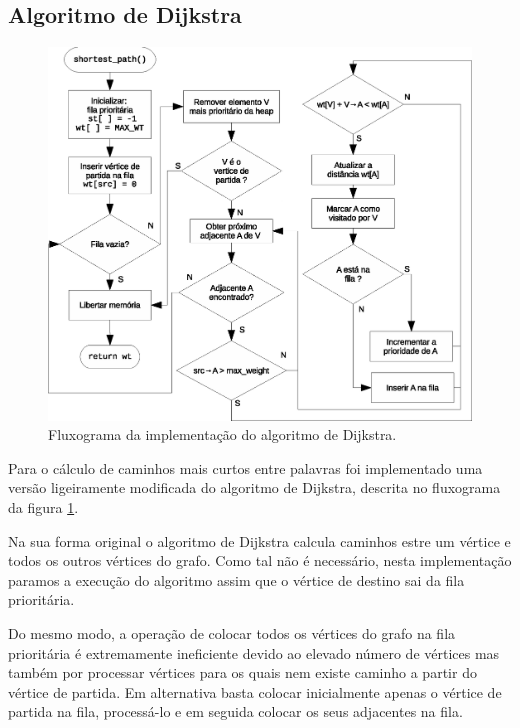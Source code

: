 \documentclass[portuguese, a4paper]{article}
\begin{document}
	\subsection{Algoritmo de Dijkstra}
	\label{sec:alg_dijkstra}
	\begin{figure}[H]
		\centering
		\includegraphics[width=0.85\linewidth]{dijkstra}
		\caption{Fluxograma da implementação do algoritmo de Dijkstra.}
		\label{fig:dijkstra}
	\end{figure}
	\par
	Para o cálculo de caminhos mais curtos entre palavras foi implementado uma
	versão ligeiramente modificada do algoritmo de Dijkstra, descrita no
	fluxograma da figura \ref{fig:dijkstra}.
	\par
	Na sua forma original o algoritmo de Dijkstra calcula caminhos estre um
	vértice e todos os outros vértices do grafo. Como tal não é necessário,
	nesta implementação paramos a execução do algoritmo assim que o vértice de
	destino sai da fila prioritária.
	\par
	Do mesmo modo, a operação de colocar todos os vértices do grafo na fila
	prioritária é extremamente ineficiente devido ao elevado número de
	vértices mas também por processar vértices para os quais nem existe caminho
	a partir do vértice de partida. Em alternativa basta colocar inicialmente
	apenas o vértice de partida na fila, processá-lo e em seguida colocar os
	seus adjacentes na fila.
\end{document}
